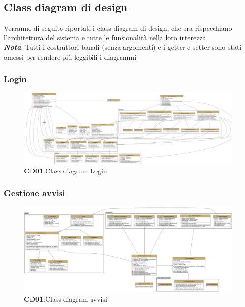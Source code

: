 \subsection{Class diagram di design}
    \begin{flushleft}
        Verranno di seguito riportati i class diagram di design, che ora rispecchiano l'architettura del sistema e tutte le funzionalità nella loro
        interezza. \\
        \emph{\textbf{Nota}}: Tutti i costruttori banali (senza argomenti) e i getter e setter sono stati omessi per rendere più leggibili 
        i diagrammi
    \end{flushleft}

    \subsubsection{Login}
        \begin{figure}[H]
            \centering
            \includegraphics[scale=0.12]{assets/diagrammi/Class diagram di design/ClassDiagram_Login.png}
            \caption*{\textbf{CD01}:Class diagram Login}\label{fig:ClassDiagram_Login}
        \end{figure}

    
    \subsubsection{Gestione avvisi}
        \begin{figure}[H]
            \centering
            \includegraphics[scale=0.17]{assets/diagrammi/Class diagram di design/ClassDiagramGestioneAvvisi.png}
            \caption*{\textbf{CD01}:Class diagram avvisi}\label{fig:ClassDiagram_Avvisi}
        \end{figure}


